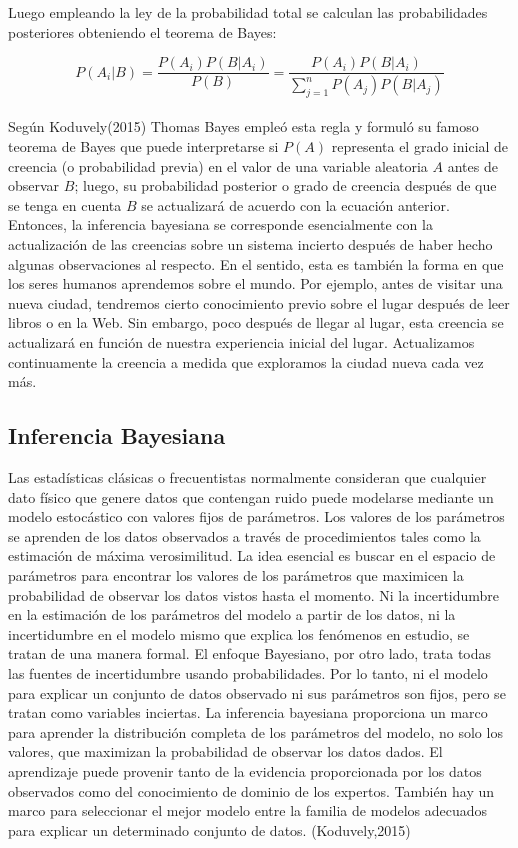Luego empleando la ley de la probabilidad total se calculan las probabilidades posteriores obteniendo el teorema de Bayes:

\[P\left(A_{i}|B\right)=
\frac{P\left(A_{i}\right)P\left(B|A_{i}\right)}{P\left(B\right)}=
\frac{P\left(A_{i}\right)P\left(B|A_{i}\right)}{\sum_{j=1}^{n}P\left(A_{j}\right)P\left(B|A_{j}\right)}
\]\\

Según Koduvely(2015) Thomas Bayes empleó esta regla y formuló su famoso teorema de Bayes que puede interpretarse si $P\left(A\right)$ representa el grado inicial de creencia (o probabilidad previa) en el valor de una variable aleatoria $A$ antes de observar $B$; luego, su probabilidad posterior o grado de creencia después de que se tenga en cuenta $B$ se actualizará de acuerdo con la ecuación anterior. Entonces, la inferencia bayesiana se corresponde esencialmente con la actualización de las creencias sobre un sistema incierto después de haber hecho algunas observaciones al respecto. En el sentido, esta es también la forma en que los seres humanos aprendemos sobre el mundo. Por ejemplo, antes de visitar una nueva ciudad, tendremos cierto conocimiento previo sobre el lugar después de leer libros o en la Web. Sin embargo, poco después de llegar al lugar, esta creencia se actualizará en función de nuestra experiencia inicial del lugar. Actualizamos continuamente la creencia a medida que exploramos la ciudad nueva cada vez más.\\

\subsection{Inferencia Bayesiana}

Las estadísticas clásicas o frecuentistas normalmente consideran que cualquier dato físico que genere datos que contengan ruido puede modelarse mediante un modelo estocástico con valores fijos de parámetros. Los valores de los parámetros se aprenden de los datos observados a través de procedimientos tales como la estimación de máxima verosimilitud. La idea esencial es buscar en el espacio de parámetros para encontrar los valores de los parámetros que maximicen la probabilidad de observar los datos vistos hasta el momento. Ni la incertidumbre en la estimación de los parámetros del modelo a partir de los datos, ni la incertidumbre en el modelo mismo que explica los fenómenos en estudio, se tratan de una manera formal. El enfoque Bayesiano, por otro lado, trata todas las fuentes de incertidumbre usando probabilidades. Por lo tanto, ni el modelo para explicar un conjunto de datos observado ni sus parámetros son fijos, pero se tratan como variables inciertas. La inferencia bayesiana proporciona un marco para aprender la distribución completa de los parámetros del modelo, no solo los valores, que maximizan la probabilidad de observar los datos dados. El aprendizaje puede provenir tanto de la evidencia proporcionada por los datos observados como del conocimiento de dominio de los expertos. También hay un marco para seleccionar el mejor modelo entre la familia de modelos adecuados para explicar un determinado conjunto de datos. (Koduvely,2015)


